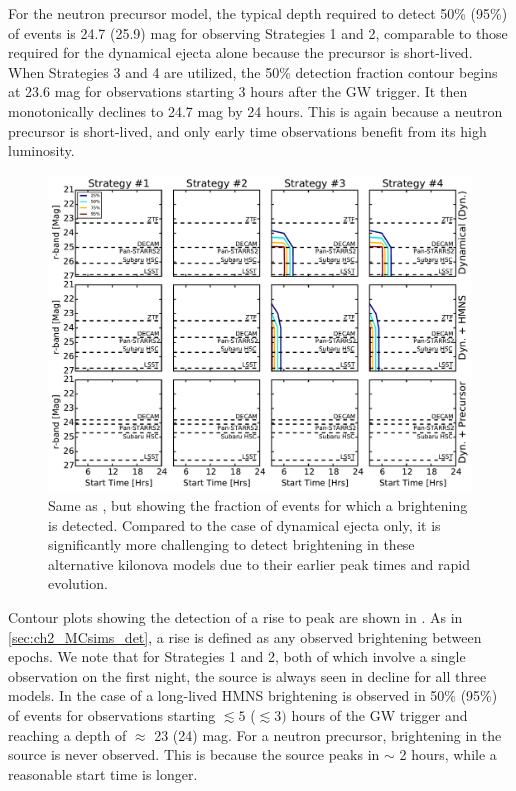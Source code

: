 For the neutron precursor model, the typical depth required to detect 50\% (95\%) of events is 24.7 (25.9) mag for observing Strategies 1 and 2, comparable to those required for the dynamical ejecta alone because the precursor is short-lived. When Strategies 3 and 4 are utilized, the 50\% detection fraction contour begins at 23.6 mag for observations starting 3 hours after the GW trigger. It then monotonically declines to 24.7 mag by 24 hours. This is again because a neutron precursor is short-lived, and only early time observations benefit from its high luminosity.

\begin{figure}[t!]
\centering
\includegraphics[width=\textwidth]{./figs/chapter2/ch2_f20.pdf}
\caption{Same as , but showing the fraction of events for which a brightening is detected. Compared to the case of dynamical ejecta only, it is significantly more challenging to detect brightening in these alternative kilonova models due to their earlier peak times and rapid evolution.}
\label{fig:ch2_altrise}
\end{figure}

Contour plots showing the detection of a rise to peak are shown in . As in \cref{sec:ch2_MCsims_det}, a rise is defined as any observed brightening between epochs. We note that for Strategies 1 and 2, both of which involve a single observation on the first night, the source is always seen in decline for all three models. In the case of a long-lived HMNS brightening is observed in 50\% (95\%) of events for observations starting $\lesssim5$ ($\lesssim 3)$ hours of the GW trigger and reaching a depth of $\approx$ 23 (24) mag. For a neutron precursor, brightening in the source is never observed. This is because the source peaks in $\sim$ 2 hours, while a reasonable start time is longer.

